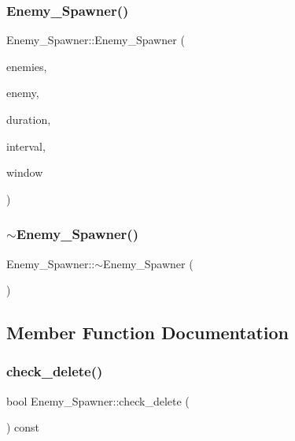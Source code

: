 \subsubsection{\texorpdfstring{Enemy\+\_\+\+Spawner()}{Enemy\_Spawner()}}
{\footnotesize\ttfamily Enemy\+\_\+\+Spawner\+::\+Enemy\+\_\+\+Spawner (\begin{DoxyParamCaption}\item[{std\+::vector$<$ std\+::shared\+\_\+ptr$<$ \hyperlink{classMovable__Obj}{Movable\+\_\+\+Obj} $>$$>$ \&}]{enemies,  }\item[{const \hyperlink{classEnemy}{Enemy} \&}]{enemy,  }\item[{int}]{duration,  }\item[{int}]{interval,  }\item[{sf\+::\+Render\+Window $\ast$}]{window }\end{DoxyParamCaption})}

\mbox{\label{classEnemy__Spawner_a1af566e66e5cc951186873c481c3284f}} 
\subsubsection{\texorpdfstring{$\sim$\+Enemy\+\_\+\+Spawner()}{~Enemy\_Spawner()}}
{\footnotesize\ttfamily Enemy\+\_\+\+Spawner\+::$\sim$\+Enemy\+\_\+\+Spawner (\begin{DoxyParamCaption}{ }\end{DoxyParamCaption})}



\subsection{Member Function Documentation}
\mbox{\label{classEnemy__Spawner_a446dc39931e10562ec2dd9497e4d8b6a}} 
\subsubsection{\texorpdfstring{check\+\_\+delete()}{check\_delete()}}
{\footnotesize\ttfamily bool Enemy\+\_\+\+Spawner\+::check\+\_\+delete (\begin{DoxyParamCaption}{ }\end{DoxyParamCaption}) const}

